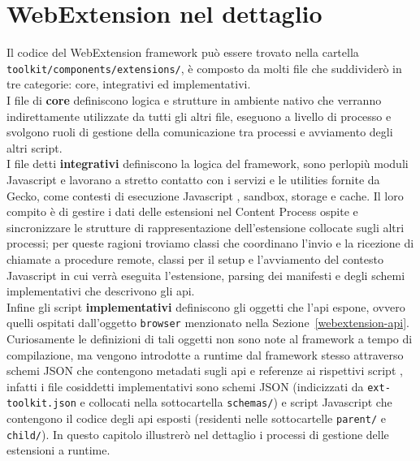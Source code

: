 \documentclass{sapthesis}
\newcommand{\bold}[1]{\textbf{#1}}
\newcommand{\code}[1]{\texttt{#1}}
\newcommand{\file}[1]{\code{#1}}
\newcommand{\Sezione}[1]{Sezione~\ref{#1}}
\newcommand{\JS}{Javascript }
\newcommand{\json}{JSON }
\begin{document}
\chapter{WebExtension nel dettaglio}
\label{cap:webextension-dettaglio}
    Il codice del WebExtension framework può essere trovato nella cartella \file{toolkit/components/extensions/}, è composto
    da molti file che suddividerò in tre categorie: core, integrativi ed implementativi.\\
    I file di \bold{core} definiscono logica e strutture in ambiente nativo che verranno indirettamente utilizzate da
    tutti gli altri file, eseguono a livello di processo e svolgono ruoli di gestione della comunicazione tra
    processi e avviamento degli altri script.\\
    I file detti \bold{integrativi} definiscono la logica del framework, sono perlopiù moduli \JS
    e lavorano a stretto contatto con i servizi e le utilities fornite da Gecko, come contesti di esecuzione \JS, sandbox, storage
    e cache. Il loro compito è di gestire i dati delle estensioni nel Content Process ospite e sincronizzare le strutture
    di rappresentazione dell'estensione collocate sugli altri processi; per queste ragioni troviamo classi che
    coordinano l'invio e la ricezione di chiamate a procedure remote, classi per il setup e l'avviamento
    del contesto \JS in cui verrà eseguita l'estensione, parsing dei manifesti e degli schemi implementativi
    che descrivono gli api.\\
    Infine gli script \bold{implementativi} definiscono gli oggetti che l'api espone, ovvero quelli ospitati
    dall'oggetto \code{browser} menzionato nella \Sezione{webextension-api}. Curiosamente le definizioni di tali
    oggetti non sono note al framework a tempo di compilazione, ma vengono introdotte a runtime dal framework stesso attraverso
    schemi \json che contengono metadati sugli api e referenze ai rispettivi script \cite{webextension-api-development}, infatti i file cosiddetti implementativi
    sono schemi \json (indicizzati da \file{ext-toolkit.json} e collocati nella sottocartella \file{schemas/}) e script \JS
    che contengono il codice degli api esposti (residenti nelle sottocartelle \file{parent/} e \file{child/}).
    In questo capitolo illustrerò nel dettaglio i processi di gestione delle estensioni a runtime. 
\end{document}
